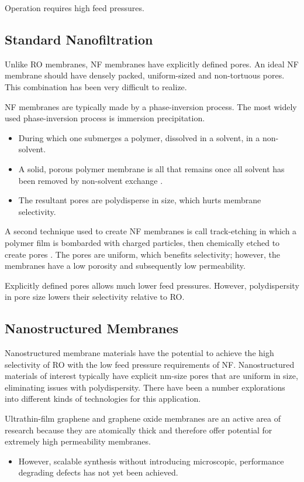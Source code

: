   Operation requires high feed pressures.
  
  \subsection{Standard Nanofiltration}

  Unlike RO membranes, NF membranes have explicitly defined pores. An
  ideal NF membrane should have densely packed, uniform-sized and
  non-tortuous pores. This combination has been very difficult to realize.
  
  NF membranes are typically made by a phase-inversion process. The most 
  widely used phase-inversion process is immersion precipitation.
  \begin{itemize}
    \item During which one submerges a polymer, dissolved in a solvent, in
    a non-solvent.
    \item A solid, porous polymer membrane is all that remains once all
    solvent has been removed by non-solvent exchange \cite{smolders_microstructures_1992}.
    \item The resultant pores are polydisperse in size, which hurts membrane selectivity. 
  \end{itemize}    
    
  A second technique used to create NF membranes is call track-etching in which a polymer
  film is bombarded with charged particles, then chemically etched to create pores
  \cite{apel_track_2001}. The pores are uniform, which benefits selectivity;
  however, the membranes have a low porosity and subsequently low permeability. 
  
  Explicitly defined pores allows much lower feed pressures. However, polydispersity in
  pore size lowers their selectivity relative to RO.
  
  \subsection{Nanostructured Membranes}
  
  Nanostructured membrane materials have the potential to achieve the high selectivity
  of RO with the low feed pressure requirements of NF. Nanostructured materials of 
  interest typically have explicit nm-size pores that are uniform in size, eliminating
  issues with polydispersity. There have been a number explorations into different
  kinds of technologies for this application.
  
  Ultrathin-film
  graphene and graphene oxide membranes are an active area of research because
  they are atomically thick and therefore offer potential for extremely high
  permeability membranes.~\cite{humplik_nanostructured_2011} 
  \begin{itemize}  
    \item However, scalable synthesis without introducing microscopic, performance
    degrading defects has not yet been achieved.~\cite{cohen-tanugi_multilayer_2016,wei_multilayered_2018}
  \end{itemize}    
  
